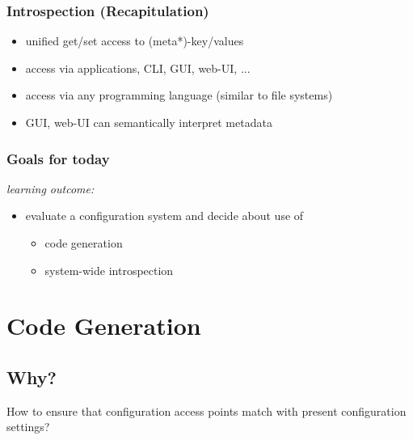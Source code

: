 \begin{frame}
	\frametitle{Introspection (Recapitulation)}
	\pause
	\begin{itemize}
	\item unified get/set access to (meta*)-key/values
	\item access via applications, CLI, GUI, web-UI, ...
	\item access via any programming language (similar to file systems)
	\item GUI, web-UI can semantically interpret metadata
	\end{itemize}
\end{frame}


\begin{frame}
	\frametitle{Goals for today}
	\textit{learning outcome:}
	\begin{itemize}
	\item evaluate a configuration system and decide about use of
	\begin{itemize}
	\item code generation
	\item system-wide introspection
	\end{itemize}
	\end{itemize}
\end{frame}

\section{Code Generation}

\subsection{Why?}

\begin{assignment}
	\begin{task}
	How to ensure that configuration access points match with present configuration settings?
	\end{task}
\end{assignment}

